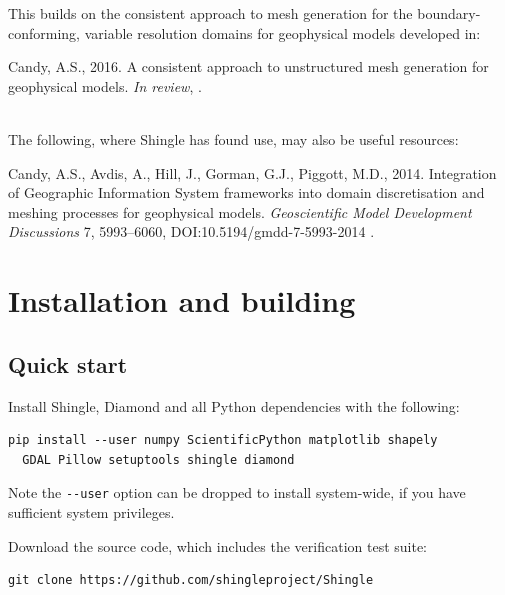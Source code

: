 \documentclass[a4paper, 10pt]{book}
\providecommand{\shingle}{Shingle\xspace}
\begin{document}
\medskip
\noindent
This builds on the consistent approach to mesh generation for the boundary-conforming, variable resolution domains for  geophysical models developed in:
\par\vskip 4pt\noindent\hspace{0.02\columnwidth}%
\begin{minipage}{0.9\columnwidth}%
Candy, A.S., 2016. A consistent approach to unstructured mesh generation for geophysical models. \emph{In review}, \citep{candybrep}.
\end{minipage}
\\

\medskip
\noindent
The following, where \shingle has found use, may also be useful resources:
\par\vskip 4pt\noindent\hspace{0.02\columnwidth}%
\begin{minipage}{0.9\columnwidth}%
Candy, A.S., Avdis, A., Hill, J., Gorman, G.J., Piggott, M.D., 2014.
Integration of Geographic Information System frameworks into domain discretisation and meshing processes for geophysical models.
\emph{Geoscientific Model Development Discussions} 7, 5993--6060, DOI:10.5194/gmdd-7-5993-2014 \citep{candygis}.
\end{minipage}




\chapter{Installation and building}
%
\section{Quick start}

\noindent
Install \shingle, Diamond and all Python dependencies with the following:
\begin{verbatim}
pip install --user numpy ScientificPython matplotlib shapely
  GDAL Pillow setuptools shingle diamond
\end{verbatim}
Note the \verb+--user+ option can be dropped to install system-wide, if you have sufficient system privileges. 
\vspace{1ex}

\noindent
Download the source code, which includes the verification test suite:
\begin{verbatim}
git clone https://github.com/shingleproject/Shingle
\end{verbatim}
\end{document}
